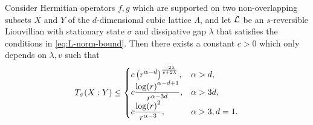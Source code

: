\begin{theorem}
\label{theorem:covariancebound}
Consider Hermitian operators $f,g$ which are supported on two non-overlapping subsets $X$ and $Y$ of the $d$-dimensional cubic lattice $\Lambda$, and let $\mathcal{L}$ be an $s$-reversible Liouvillian with stationary state $\sigma$ and dissipative gap $\lambda$ that satisfies the conditions in \cref{eq:L-norm-bound}.
Then there exists a constant $c > 0$ which only depends on $\lambda, v$  such that
\begin{equation}
\label{eq:bounds-covar-correl}
T_\sigma (X:Y) \leq \begin{cases}
     \displaystyle  c \left( r^{\alpha - d} \right)^{\frac{-2 \lambda}{ v + 2\lambda}},& \alpha > d,
    \\ \displaystyle c \frac{\log(r)^{\alpha-d+1}}{r^{\alpha-3d}},& \alpha > 3d,
    \\ \displaystyle c\frac{\log(r)^2}{r^{\alpha-3}},& \alpha> 3, d=1.
    \end{cases}
\end{equation}
\end{theorem}

